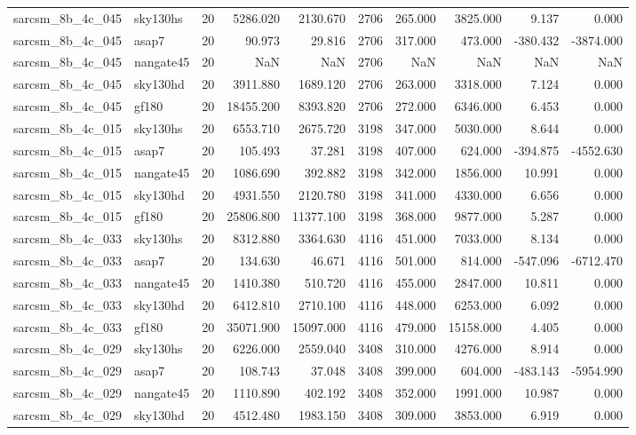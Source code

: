 \begin{longtable}{llrrrrrrrr}
sarcsm\_8b\_4c\_045 & sky130hs & 20 & 5286.020 & 2130.670 & 2706 & 265.000 & 3825.000 & 9.137 & 0.000 \\
sarcsm\_8b\_4c\_045 & asap7 & 20 & 90.973 & 29.816 & 2706 & 317.000 & 473.000 & -380.432 & -3874.000 \\
sarcsm\_8b\_4c\_045 & nangate45 & 20 & NaN & NaN & 2706 & NaN & NaN & NaN & NaN \\
sarcsm\_8b\_4c\_045 & sky130hd & 20 & 3911.880 & 1689.120 & 2706 & 263.000 & 3318.000 & 7.124 & 0.000 \\
sarcsm\_8b\_4c\_045 & gf180 & 20 & 18455.200 & 8393.820 & 2706 & 272.000 & 6346.000 & 6.453 & 0.000 \\
sarcsm\_8b\_4c\_015 & sky130hs & 20 & 6553.710 & 2675.720 & 3198 & 347.000 & 5030.000 & 8.644 & 0.000 \\
sarcsm\_8b\_4c\_015 & asap7 & 20 & 105.493 & 37.281 & 3198 & 407.000 & 624.000 & -394.875 & -4552.630 \\
sarcsm\_8b\_4c\_015 & nangate45 & 20 & 1086.690 & 392.882 & 3198 & 342.000 & 1856.000 & 10.991 & 0.000 \\
sarcsm\_8b\_4c\_015 & sky130hd & 20 & 4931.550 & 2120.780 & 3198 & 341.000 & 4330.000 & 6.656 & 0.000 \\
sarcsm\_8b\_4c\_015 & gf180 & 20 & 25806.800 & 11377.100 & 3198 & 368.000 & 9877.000 & 5.287 & 0.000 \\
sarcsm\_8b\_4c\_033 & sky130hs & 20 & 8312.880 & 3364.630 & 4116 & 451.000 & 7033.000 & 8.134 & 0.000 \\
sarcsm\_8b\_4c\_033 & asap7 & 20 & 134.630 & 46.671 & 4116 & 501.000 & 814.000 & -547.096 & -6712.470 \\
sarcsm\_8b\_4c\_033 & nangate45 & 20 & 1410.380 & 510.720 & 4116 & 455.000 & 2847.000 & 10.811 & 0.000 \\
sarcsm\_8b\_4c\_033 & sky130hd & 20 & 6412.810 & 2710.100 & 4116 & 448.000 & 6253.000 & 6.092 & 0.000 \\
sarcsm\_8b\_4c\_033 & gf180 & 20 & 35071.900 & 15097.000 & 4116 & 479.000 & 15158.000 & 4.405 & 0.000 \\
sarcsm\_8b\_4c\_029 & sky130hs & 20 & 6226.000 & 2559.040 & 3408 & 310.000 & 4276.000 & 8.914 & 0.000 \\
sarcsm\_8b\_4c\_029 & asap7 & 20 & 108.743 & 37.048 & 3408 & 399.000 & 604.000 & -483.143 & -5954.990 \\
sarcsm\_8b\_4c\_029 & nangate45 & 20 & 1110.890 & 402.192 & 3408 & 352.000 & 1991.000 & 10.987 & 0.000 \\
sarcsm\_8b\_4c\_029 & sky130hd & 20 & 4512.480 & 1983.150 & 3408 & 309.000 & 3853.000 & 6.919 & 0.000 \\

\end{longtable}
